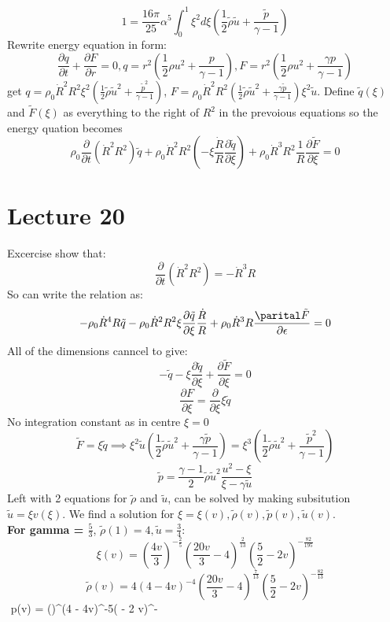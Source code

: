 \documentclass{article}
\begin{document}
        $$
        1 = \frac{16\pi}{25} \alpha^5 \int^1_0 \xi^2 d\xi (\frac{1}{2} \tilde \rho \tilde u + \frac{\tilde p}{\gamma - 1})
        $$
        Rewrite energy equation in form:
        $$
        \frac{\partial q}{\partial t} + \frac{\partial F}{\partial r}  =0, q = r^2 (\frac{1}{2}\rho u^2 + \frac{p}{\gamma -1}), F = r^2 (\frac{1}{2} \rho u^2 + \frac{\gamma p}{\gamma -1})
        $$
        get $q = \rho_0 \dot R^2 R^2 \xi^2 (\frac{1}{2} \tilde \rho \tilde u^2 + \frac{\tilde p^2}{\gamma -1})$, $F = \rho_0 \dot R^2 R^2( \frac{1}{2} \tilde \rho \tilde u^2 + \frac{\gamma \tilde p}{\gamma -1}) \xi^2 \tilde u$. Define $\tilde q(\xi)$ and $\tilde F(\xi)$ as everything to the right of $R^2$ in the prevoious equations so the energy quation becomes
        $$
        \rho_0 \frac{\partial}{\partial t}(\dot R^2 R^2 ) \tilde q + \rho_0 \dot R^2 R^2 ( - \xi \frac{\dot R}{R} \frac{\partial \tilde q}{\partial \xi} ) + \rho_0 \dot R^3 R^2 \frac{1}{R} \frac{\partial \tilde F}{\partial \xi} = 0
        $$
        \section{Lecture 20}
        Excercise show that:
$$
\frac{\partial}{\partial t} (\dot R^2 R^2) = - \dot R^3 R
$$
So can write the relation as:
$$
-\rho_0 \dot R^4 R \tilde q - \rho_0 \dot R^2 R^2 \xi \frac{\partial \tilde q}{\partial \xi} \frac{\dot R}{R} + \rho_0 \dot R^3 R \frac{\parital \tilde F}{\partial \epsilon} = 0
$$
All of the dimensions canncel to give:
$$
- \tilde q - \xi \frac{\partial \tilde q}{\partial \xi} + \frac{\partial \tilde F}{\partial \xi} =0 
$$
$$
 \frac{\partial F}{\partial \xi} = \frac{\partial}{\partial \xi}{\xi \tilde q}
$$
No integration constant as in centre $\xi = 0$
$$
\tilde F = \xi \tilde q \implies \xi^2 \tilde u (\frac{1}{2} \tilde \rho \tilde u^2 + \frac{\gamma \tilde p}{\gamma -1}) = \xi^3(\frac{1}{2} \tilde \rho \tilde u^2 + \frac{\tilde p^2}{\gamma -1})

$$
\begin{equation}
\tilde p = \frac{\gamma -1}{2} \tilde \rho \tilde u^2 \frac{u^2 - \xi}{\xi - \gamma \tilde u}
               \end{equation}
               Left with 2 equations for $\tilde \rho $ and $\tilde u$, can be solved by making subsitution $\tilde u = \xi v(\xi)$. We find a solution for $\xi = \xi(v), \tilde \rho(v), \tilde p(v), \tilde u(v)$.\\
               \textbf{For gamma = $\frac{5}{3}$}, $\tilde \rho(1) = 4, \tilde u = \frac{3}{4}$:
               $$
       \xi(v) = (\frac{4v}{3})^{-\frac{2}{5}} (\frac{20 v}{3} - 4)^{\frac{2}{13}} (\frac{5}{2} - 2 v)^{- \frac{82}{195}}
               $$
               $$
               \tilde \rho(v) = 4 (4 - 4v)^{-4} (\frac{20 v}{3} - 4)^{\frac{7}{13}} (\frac{5}{2} - 2 v)^{- \frac{82}{13}}
               $$
               $$
               \tilde p(v) =  ()^{}(4 - 4v)^{-5}( - 2 v)^{- }
\end{document}
